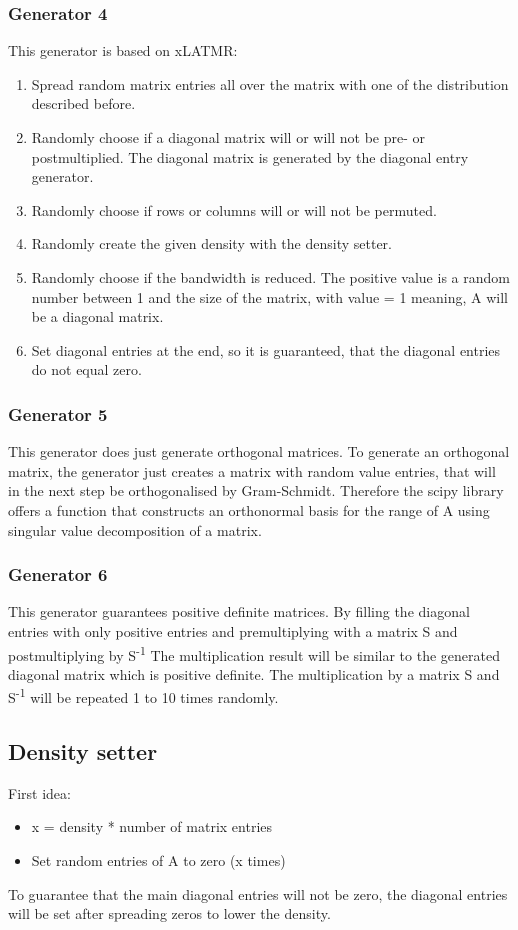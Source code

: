 \documentclass[parskip=full]{scrartcl}
\begin{document}
\subsubsection{Generator 4}
This generator is based on xLATMR:
\begin{enumerate}
	\item Spread random matrix entries all over the matrix with one of the distribution described before.
	\item Randomly choose if a diagonal matrix will or will not be pre- or postmultiplied. The diagonal matrix is generated by the diagonal entry generator.
	\item Randomly choose if rows or columns will or will not be permuted.
	\item Randomly create the given density with the density setter.
	\item Randomly choose if the bandwidth is reduced. The positive value is a random number between 1 and the size of the matrix, with value = 1 meaning, A will be a diagonal matrix.
	\item Set diagonal entries at the end, so it is guaranteed, that the diagonal entries do not equal zero.
\end{enumerate}

\subsubsection{Generator 5}
This generator does just generate orthogonal matrices. 
To generate an orthogonal matrix, the generator just creates a matrix with random value entries, that will in the next step be orthogonalised by Gram-Schmidt. Therefore the scipy library \cite{scipy} offers a function that constructs an orthonormal basis for the range of A using singular value decomposition of a matrix.

\subsubsection{Generator 6}
This generator guarantees positive definite matrices.
By filling the diagonal entries with only positive entries and premultiplying with a matrix S and postmultiplying by S\textsuperscript{-1}
The multiplication result will be similar to the generated diagonal matrix which is positive definite. The multiplication by a matrix S and S\textsuperscript{-1} will be repeated 1 to 10 times randomly.

\subsection{Density setter}
First idea:
\begin{itemize}
	\item x = density * number of matrix entries
	\item Set random entries of A to zero (x times)
\end{itemize}
To guarantee that the main diagonal entries will not be zero, the diagonal entries will be set after spreading zeros to lower the density.
\end{document}

